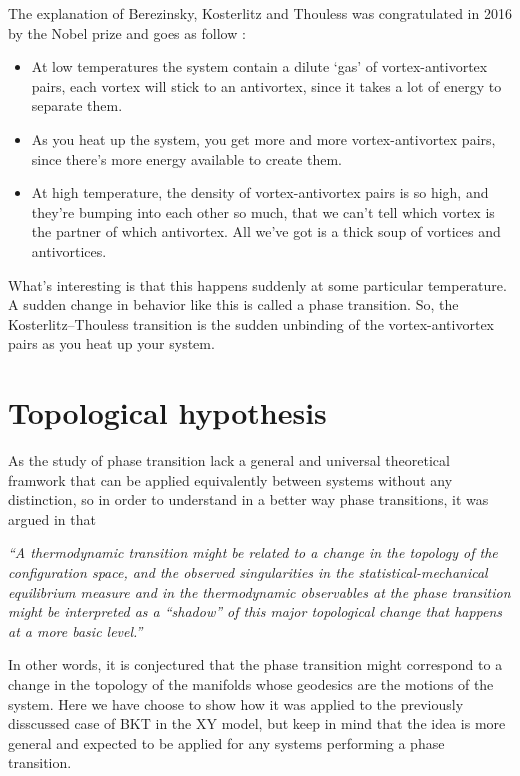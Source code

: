 \documentclass[a4paper,11pt]{article}
\begin{document}
The explanation of Berezinsky, Kosterlitz and Thouless was congratulated in 2016 by the Nobel prize and goes as follow \cite{kosterlitz1973j}: 

\begin{itemize}

\item At low temperatures the system contain a dilute ‘gas’ of vortex-antivortex pairs, each vortex will stick to an antivortex, since it takes a lot of energy to separate them.

\item As you heat up the system, you get more and more vortex-antivortex pairs, since there’s more energy available to create them. 

\item At high temperature, the density of vortex-antivortex pairs is so high, and they’re bumping into each other so much, that we can’t tell which vortex is the partner of which antivortex. All we’ve got is a thick soup of vortices and antivortices.

\end{itemize}

What’s interesting is that this happens suddenly at some particular temperature. A sudden change in behavior like this is called a phase transition. So, the Kosterlitz–Thouless transition is the sudden unbinding of the vortex-antivortex pairs as you heat up your system.


\section{Topological hypothesis}

As the study of phase transition lack a general and universal theoretical framwork that can be applied equivalently between systems without any distinction, so in order to understand in a better way phase transitions, it was argued in \cite{caiani1997geometry} that 

\begin{center}\textit{
“A thermodynamic transition might be related to a change in the topology of the configuration space, and the observed singularities in the statistical-mechanical equilibrium measure and in the thermodynamic observables at the phase transition might be interpreted as a “shadow” of this major topological change that happens at a more basic level.”}
\end{center}

In other words, it is conjectured that the phase transition might correspond to a change in the topology of the manifolds whose geodesics are the motions of the system. Here we have choose to show how it was applied to the previously disscussed case of BKT in the XY model, but keep in mind that the idea is more general and expected to be applied for any systems performing a phase transition. 
\end{document}
